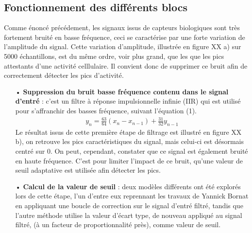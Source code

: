 \documentclass[a4paper,12pt]{article}
\begin{document}
\subsection{Fonctionnement des différents blocs}
Comme énoncé précédement, les signaux issus de capteurs biologiques sont très fortement bruité en basse fréquence, ceci se caractérise par une forte variation de l'amplitude du signal. Cette variation d'amplitude, illustrée en figure XX a) sur 5000 échantillons, est du même ordre, voir plus grand, que les que les pics attestants d'une activité celllulaire. Il convient donc de supprimer ce bruit afin de correctement détecter les pics d'activité.\\
\begin{itemize}
\item[•] \textbf{Suppression du bruit basse fréquence contenu dans le signal d'entré} : c'est un filtre à réponse impulsionnelle infinie (IIR) qui est utilisé pour s'affranchir des basses fréquence, suivant l'équation (1).
\begin{eqnarray}
y_n = \frac{63}{64}\left(x_n - x_{n-1}\right) + \frac{31}{32}y_{n-1}
\end{eqnarray}
Le résultat issus de cette première étape de filtrage est illustré en figure XX b), on retrouve les pics caractéristiques du signal, mais celui-ci est désormais centré sur 0. On peut, cependant, constater que ce signal est également bruité en haute fréquence. C'est pour limiter l'impact de ce bruit, qu'une valeur de seuil adaptative est utilisée afin détecter les pics.\\

\item[•] \textbf{Calcul de la valeur de seuil} : deux modèles différents ont été explorés lors de cette étape, l'un d'entre eux reprennant les travaux de Yannick Bornat en appliquant une boucle de correction sur le signal d'entré filtré, tandis que l'autre méthode utilise la valeur d'écart type, de nouveau appliqué au signal filtré, (à un facteur de proportionnalité près), comme valeur de seuil.\\


\end{itemize}
\end{document}
